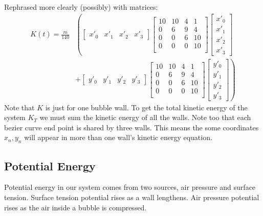 \documentclass{article}
\begin{document}
Rephrased more clearly (possibly) with matrices:
\begin{align*}
K(t)=
\frac{m}{140} &\left(
\begin{bmatrix} x'_0 & x'_1 & x'_2 & x'_3 \end{bmatrix}
 \begin{bmatrix} 
10 & 10 & 4 & 1\\
0 & 6 & 9 & 4\\
0 & 0 & 6 & 10\\
0 & 0 & 0 & 10\\ 
\end{bmatrix}
\begin{bmatrix} x'_0\\x'_1\\x'_2\\x'_3 \end{bmatrix}
\right.\\
&+ \left.
\begin{bmatrix} y'_0 & y'_1 & y'_2 & y'_3 \end{bmatrix}
 \begin{bmatrix} 
10 & 10 & 4 & 1\\
0 & 6 & 9 & 4\\
0 & 0 & 6 & 10\\
0 & 0 & 0 & 10\\ 
\end{bmatrix}
\begin{bmatrix} y'_0\\y'_1\\y'_2\\y'_3 \end{bmatrix} 
\right)
\end{align*}
Note that $K$ is just for one bubble wall. To get the total
kinetic energy of the system $K_T$ we must sum the kinetic energy of all the
walls. Note too that each bezier curve end point is shared by three walls. This
means the some coordinates $x_n, y_n$ will appear in more than one wall's kinetic energy equation.
\subsection{Potential Energy}
Potential energy in our system comes from two sources, air pressure and surface
tension. Surface tension potential rises as a wall lengthens.
Air pressure potential rises as the air inside a bubble is compressed.
\end{document}
